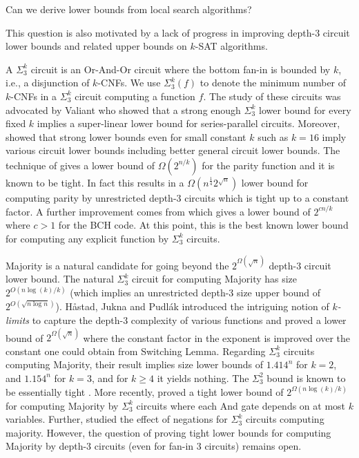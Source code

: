 \begin{question}
Can we derive lower bounds from local search algorithms?
\end{question}

This question is also motivated by a lack of progress
in improving depth-3 circuit lower bounds and 
related upper bounds on $k$-SAT algorithms.

\bigskip
{} A $\Sigma^k_3$ circuit is an 
Or-And-Or circuit where the bottom fan-in is bounded by $k$, i.e., a disjunction of $k$-CNFs. We use $\Sigma^k_3(f)$ to denote the minimum number of $k$-CNFs in a $\Sigma^k_3$ circuit computing a function $f$. The study of 
these circuits was advocated by Valiant \cite{Valiant77} who showed that a 
strong enough $\Sigma^k_3$ lower bound for every fixed $k$ implies 
a super-linear lower bound for series-parallel circuits. Moreover, \cite{GKW21circuit} showed that strong lower bounds even for small constant $k$ such as $k=16$ imply various circuit lower bounds including better general circuit lower bounds.
The technique of \cite{PaturiPZ99} gives a lower bound of $\Omega(2^{n/k})$ 
for the parity function and it is known to be 
tight. In fact this results in a $\Omega(n^{\frac{1}{4}} 2^{\sqrt{n}})$ lower bound
for computing parity by unrestricted 
depth-3 circuits which is tight up to a constant factor. 
A further improvement comes from  \cite{PaturiPSZ05} which 
gives a lower bound of $2^{cn/k}$ where $c > 1$ for the BCH code. 
At this point, this is the best known
lower bound for computing any explicit function by $\Sigma^k_3$ circuits.

\bigskip
Majority is a natural candidate 
for going beyond the $2^{\Omega(\sqrt{n})}$ depth-3 circuit lower bound.
The natural $\Sigma^k_3$ circuit for 
computing Majority has size $2^{O(n\log(k)/k)}$ (which implies an unrestricted depth-3 size upper bound of $2^{O(\sqrt{n\log n})}$). H\r{a}stad, Jukna and Pudl\'ak \cite{HastadJP95} introduced the intriguing notion of \emph{$k$-limits} to capture the depth-3 complexity of various functions  
and proved a lower bound of $2^{\Omega(\sqrt{n})}$ where the constant factor in the 
exponent is improved  over the constant one could obtain from Switching Lemma. 
Regarding $\Sigma^k_3$ circuits computing Majority, their result implies size lower bounds of  $1.414^n$ for $k = 2$, and $1.154^n$ for $k = 3$, and for $k \ge 4$ it yields nothing. The $\Sigma^2_3$ bound is known to be essentially tight \cite{PaturiSZ00}. More recently,
\cite{LecomteRT22} proved a tight lower bound of $2^{\Omega(n\log(k)/k)}$ for 
computing Majority by $\Sigma^k_3$ circuits where each 
And gate depends on at most $k$ variables.
Further, \cite{Amano23Majority} studied the effect of negations for $\Sigma^k_3$ circuits computing majority.
However, the question of proving tight lower bounds for computing Majority by depth-3 circuits 
(even for fan-in 3 circuits) remains open.

